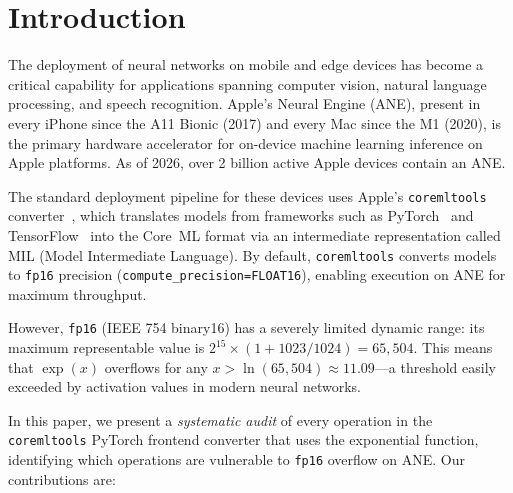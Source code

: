 \documentclass[10pt,twocolumn]{article}
\newcommand{\fp}{\texttt{fp16}}
\newcommand{\ane}{ANE}
\newcommand{\coreml}{Core~ML}
\newcommand{\coremltools}{\texttt{coremltools}}
\begin{document}
\section{Introduction}
\label{sec:intro}

The deployment of neural networks on mobile and edge devices has
become a critical capability for applications spanning computer
vision, natural language processing, and speech recognition.
Apple's Neural Engine (\ane{}), present in every iPhone since the
A11 Bionic (2017) and every Mac since the M1 (2020), is the
primary hardware accelerator for on-device machine learning
inference on Apple platforms.  As of 2026, over 2 billion active
Apple devices contain an \ane{}.

The standard deployment pipeline for these devices uses Apple's \coremltools{}
converter~\citep{coremltools2024}, which translates models from frameworks such
as PyTorch~\citep{paszke2019pytorch} and TensorFlow~\citep{abadi2016tensorflow}
into the \coreml{} format via an intermediate representation called MIL (Model
Intermediate Language).  By default, \coremltools{} converts models to \fp{}
precision (\texttt{compute\_precision=FLOAT16}), enabling execution on \ane{}
for maximum throughput.

However, \fp{} (IEEE 754 binary16) has a severely limited dynamic
range: its maximum representable value is
$2^{15} \times (1 + 1023/1024) = 65{,}504$.  This means that
$\exp(x)$ overflows for any $x > \ln(65{,}504) \approx 11.09$---a
threshold easily exceeded by activation values in modern neural
networks.

In this paper, we present a \emph{systematic audit} of every
operation in the \coremltools{} PyTorch frontend converter that
uses the exponential function, identifying which operations are
vulnerable to \fp{} overflow on \ane{}.  Our contributions are:
\end{document}
